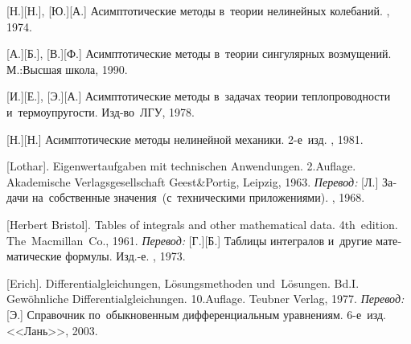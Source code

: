 \begin{thebibliography}{123}
\begin{otherlanguage}{russian}
[Н.][Н.], [Ю.][А.] Асимптотические методы в~теории нелинейных колебаний. \naukapublisher, 1974. 

[А.][Б.], [В.][Ф.] Асимптотические методы в~теории сингулярных возмущений. М.:\;Высшая школа, 1990. 

[И.][Е.], %
[Э.][А.] %
Асимптотические методы в~задачах теории теплопроводности и~термоупругости. Изд\hbox{-}во~ЛГУ, 1978. 

[Н.][Н.] Асимптотические методы нелинейной механики. 2\hbox{-}е~изд. \naukapublisher, 1981. 

%
%



[Lothar]. Eigenwertaufgaben mit technischen Anwendungen. 2.\:Auflage. Akademische Verlagsgesellschaft Geest\;\&\;Portig, Leipzig, 1963. 
\emph{Перевод:} [Л.] Задачи на~собственные значения~(с~техническими приложениями). \naukapublisher, 1968. 

[Herbert Bristol]. Tables of integrals and other mathematical data. 4th~edition. The~Macmillan~Co., 1961. 
\emph{Перевод:} [Г.][Б.] Таблицы интегралов и~другие математические формулы. Изд.\hbox{-}е. \naukapublisher, 1973. 

[Erich]. Differentialgleichungen, Lösungsmethoden und~Lö\-sun\-gen. Bd.\:I. Gewöhnliche Differentialgleichungen. 10.\:Auflage. Teubner Verlag, 1977. 
\emph{Перевод:} [Э.] Справочник по~обыкновенным дифференциальным уравнениям. 6\hbox{-}е~изд. <<Лань>>, 2003. 


\end{otherlanguage}
\end{thebibliography}
